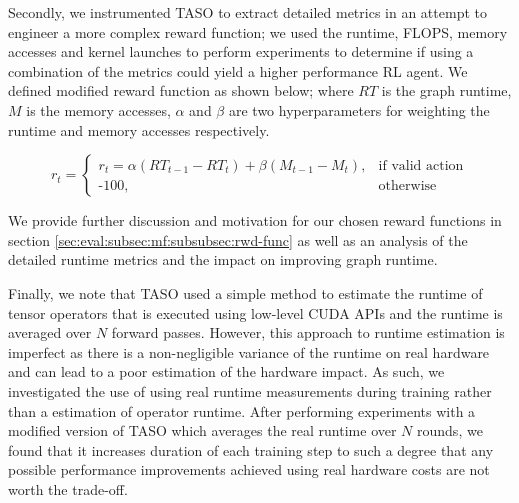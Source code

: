 Secondly, we instrumented TASO to extract detailed metrics in an attempt to engineer a more complex reward function; we used the runtime, FLOPS, memory accesses and kernel launches to perform experiments to determine if using a combination of the metrics could yield a higher performance RL agent. We defined modified reward function as shown below; where $RT$ is the graph runtime, $M$ is the memory accesses, $\alpha$ and $\beta$ are two hyperparameters for weighting the runtime and memory accesses respectively.

$$
r_t =
\begin{cases}
  r_t = \alpha(RT_{t-1} - RT_t) + \beta(M_{t-1} - M_t), & \text{if valid action}\\
  \text{-}100,            & \text{otherwise}
\end{cases}
$$

We provide further discussion and motivation for our chosen reward functions in section \ref{sec:eval:subsec:mf:subsubsec:rwd-func} as well as an analysis of the detailed runtime metrics and the impact on improving graph runtime.

Finally, we note that TASO used a simple method to estimate the runtime of tensor operators that is executed using low-level CUDA APIs and the runtime is averaged over $N$ forward passes. However, this approach to runtime estimation is imperfect as there is a non-negligible variance of the runtime on real hardware and can lead to a poor estimation of the hardware impact. As such, we investigated the use of using real runtime measurements during training rather than a estimation of operator runtime. After performing experiments with a modified version of TASO which averages the real runtime over $N$ rounds, we found that it increases duration of each training step to such a degree that any possible performance improvements achieved using real hardware costs are not worth the trade-off.
